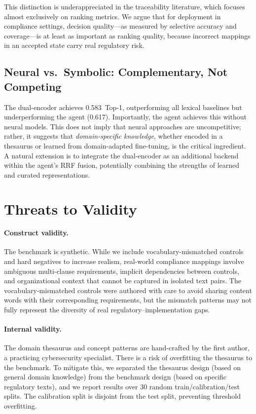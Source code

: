 \documentclass{sn-jnl}
\begin{document}
This distinction is underappreciated in the traceability literature, which focuses almost exclusively on ranking metrics.
We argue that for deployment in compliance settings, decision quality---as measured by selective accuracy and coverage---is at least as important as ranking quality, because incorrect mappings in an accepted state carry real regulatory risk.

\subsection{Neural vs.\ Symbolic: Complementary, Not Competing}

The dual-encoder achieves 0.583~Top-1, outperforming all lexical baselines but underperforming the agent (0.617).
Importantly, the agent achieves this without neural models.
This does not imply that neural approaches are uncompetitive; rather, it suggests that \emph{domain-specific knowledge}, whether encoded in a thesaurus or learned from domain-adapted fine-tuning, is the critical ingredient.
A natural extension is to integrate the dual-encoder as an additional backend within the agent's RRF fusion, potentially combining the strengths of learned and curated representations.


\section{Threats to Validity}
\label{sec:threats}

\paragraph{Construct validity.}
The benchmark is synthetic.
While we include vocabulary-mismatched controls and hard negatives to increase realism, real-world compliance mappings involve ambiguous multi-clause requirements, implicit dependencies between controls, and organizational context that cannot be captured in isolated text pairs.
The vocabulary-mismatched controls were authored with care to avoid sharing content words with their corresponding requirements, but the mismatch patterns may not fully represent the diversity of real regulatory--implementation gaps.

\paragraph{Internal validity.}
The domain thesaurus and concept patterns are hand-crafted by the first author, a practicing cybersecurity specialist.
There is a risk of overfitting the thesaurus to the benchmark.
To mitigate this, we separated the thesaurus design (based on general domain knowledge) from the benchmark design (based on specific regulatory texts), and we report results over 30 random train/calibration/test splits.
The calibration split is disjoint from the test split, preventing threshold overfitting.
\end{document}
